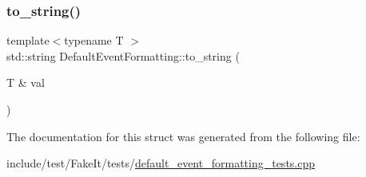 \mbox{\label{structDefaultEventFormatting_a2d24d92651609c3a232fda8eb7342c89}} 
\subsubsection{\texorpdfstring{to\_string()}{to\_string()}}
{\footnotesize\ttfamily template$<$typename T $>$ \\
std\+::string Default\+Event\+Formatting\+::to\+\_\+string (\begin{DoxyParamCaption}\item[{T \&}]{val }\end{DoxyParamCaption})\hspace{0.3cm}{\ttfamily [inline]}}



The documentation for this struct was generated from the following file\+:\begin{DoxyCompactItemize}
\item 
include/test/\+Fake\+It/tests/\mbox{\hyperlink{default__event__formatting__tests_8cpp}{default\+\_\+event\+\_\+formatting\+\_\+tests.\+cpp}}\end{DoxyCompactItemize}

